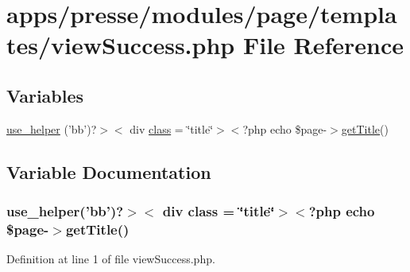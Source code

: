 \hypertarget{presse_2modules_2page_2templates_2view_success_8php}{\section{apps/presse/modules/page/templates/view\-Success.php File Reference}
\label{presse_2modules_2page_2templates_2view_success_8php}
}
\subsection*{Variables}
\begin{DoxyCompactItemize}
\item 
\hyperlink{presse_2modules_2page_2templates_2view_success_8php_ad20740d877696f45a78b0497ff807965}{use\-\_\-helper} ('bb')?$>$$<$ div \hyperlink{live_2modules_2news_2templates_2__actualitelight_8php_a185c73c6507391d1eb38c776b68ce96d}{class} = \char`\"{}title\char`\"{}$>$$<$?php echo \$page-\/$>$\hyperlink{backend_2modules_2block_2templates_2index_success_8php_a58abfb4a1e6c312e255e475413e1d76d}{get\-Title}()
\end{DoxyCompactItemize}


\subsection{Variable Documentation}
\hypertarget{presse_2modules_2page_2templates_2view_success_8php_ad20740d877696f45a78b0497ff807965}{
\subsubsection[{use\-\_\-helper}]{\setlength{\rightskip}{0pt plus 5cm}use\-\_\-helper('bb')?$>$$<$ div {\bf class} = \char`\"{}title\char`\"{}$>$$<$?php echo \$page-\/$>${\bf get\-Title}()}}\label{presse_2modules_2page_2templates_2view_success_8php_ad20740d877696f45a78b0497ff807965}


Definition at line 1 of file view\-Success.\-php.

